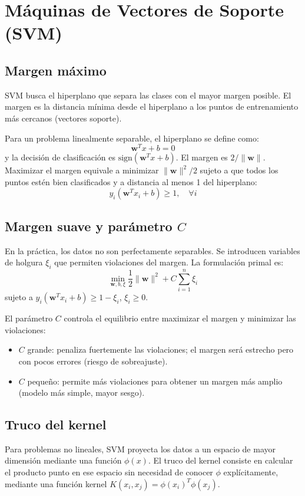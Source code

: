\documentclass[12pt,a4paper,openany,oneside]{book}
\begin{document}
\section{Máquinas de Vectores de Soporte (SVM)}

\subsection{Margen máximo}
SVM busca el hiperplano que separa las clases con el mayor margen posible. El margen es la distancia mínima desde el hiperplano a los puntos de entrenamiento más cercanos (vectores soporte).

Para un problema linealmente separable, el hiperplano se define como:
\[
\mathbf{w}^T x + b = 0
\]
y la decisión de clasificación es \(\text{sign}(\mathbf{w}^T x + b)\). El margen es \(2 / \|\mathbf{w}\|\). Maximizar el margen equivale a minimizar \(\|\mathbf{w}\|^2 / 2\) sujeto a que todos los puntos estén bien clasificados y a distancia al menos 1 del hiperplano:
\[
y_i (\mathbf{w}^T x_i + b) \ge 1, \quad \forall i
\]

\subsection{Margen suave y parámetro \(C\)}
En la práctica, los datos no son perfectamente separables. Se introducen variables de holgura \(\xi_i\) que permiten violaciones del margen. La formulación primal es:
\[
\min_{\mathbf{w}, b, \xi} \frac{1}{2} \|\mathbf{w}\|^2 + C \sum_{i=1}^n \xi_i
\]
sujeto a \(y_i (\mathbf{w}^T x_i + b) \ge 1 - \xi_i\), \(\xi_i \ge 0\).

El parámetro \(C\) controla el equilibrio entre maximizar el margen y minimizar las violaciones:
\begin{itemize}
    \item \(C\) grande: penaliza fuertemente las violaciones; el margen será estrecho pero con pocos errores (riesgo de sobreajuste).
    \item \(C\) pequeño: permite más violaciones para obtener un margen más amplio (modelo más simple, mayor sesgo).
\end{itemize}

\subsection{Truco del kernel}
Para problemas no lineales, SVM proyecta los datos a un espacio de mayor dimensión mediante una función \(\phi(x)\). El truco del kernel consiste en calcular el producto punto en ese espacio sin necesidad de conocer \(\phi\) explícitamente, mediante una función kernel \(K(x_i, x_j) = \phi(x_i)^T \phi(x_j)\).
\end{document}
